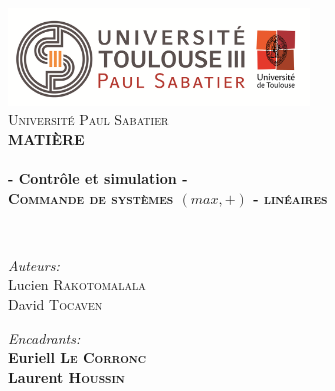 
\begin{titlepage}
\begin{center}


\includegraphics[width=0.60\textwidth]{./page_de_garde/logo_ups.png}~\\[1cm]

\textsc{\LARGE Université Paul Sabatier}\\[1.5cm]

\textsc{\Large \bf MATIÈRE }\\[0.5cm]

\HRule \\[0.4cm]

{\huge \bfseries  - Contrôle et simulation -\\
\vspace{3mm}
\textsc{ Commande de systèmes $(max,+)$ - linéaires}}

\HRule \\[1.5cm]

\begin{minipage}{0.4\textwidth}
\begin{flushleft} \large
\emph{Auteurs:}\\
Lucien \textsc{Rakotomalala}\\
David \textsc{Tocaven}\\
\end{flushleft}
\end{minipage}
\begin{minipage}{0.58\textwidth}
\begin{flushright} \large
\emph{Encadrants:} \\
\textbf{ Euriell \textsc{Le Corronc}}\\
\textbf{ Laurent \textsc{Houssin}}
\end{flushright}
\end{minipage}
\newline
\newline


\end{center}
\end{titlepage}
